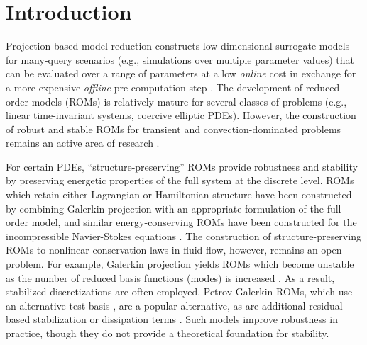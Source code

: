 \documentclass[review]{siamart171218}
\theoremstyle{assumption}
\begin{document}
\section{Introduction}

Projection-based model reduction constructs low-dimensional surrogate models for many-query scenarios (e.g., simulations over multiple parameter values) that can be evaluated over a range of parameters at a low \textit{online} cost in exchange for a more expensive \textit{offline} pre-computation step \cite{benner2015survey}.  %
The development of reduced order models (ROMs) is relatively mature for several classes of problems (e.g., linear time-invariant systems, coercive elliptic PDEs).  However, the construction of robust and stable ROMs for transient and convection-dominated problems remains an active area of research \cite{cagniart2019model}.  

For certain PDEs, ``structure-preserving'' ROMs provide robustness and stability by preserving energetic properties of the full system at the discrete level.  ROMs which retain either Lagrangian \cite{lall2003structure, carlberg2015preserving} or Hamiltonian structure \cite{polyuga2010structure, benner2012interpolation, gugercin2012structure, peng2016symplectic, chaturantabut2016structure, gong2017structure, afkham2017structure, afkham2018structure} have been constructed by combining Galerkin projection with an appropriate formulation of the full order model, and similar energy-conserving ROMs have been constructed for the incompressible Navier-Stokes equations \cite{farhat2014dimensional, farhat2015structure}.  The construction of structure-preserving ROMs to nonlinear conservation laws in fluid flow, however, remains an open problem.  For example, Galerkin projection yields ROMs which become unstable as the number of reduced basis functions (modes) is increased \cite{bui2007goal, carlberg2013gnat}.  As a result, stabilized discretizations are often employed.  Petrov-Galerkin ROMs, which use an alternative test basis \cite{maday2002blackbox, rozza2007stability, bui2007goal, amsallem2012stabilization, rozza2013reduced, ballarin2015supremizer, carlberg2017galerkin}, are a popular alternative, as are additional residual-based stabilization or dissipation terms \cite{wang2012proper, kalashnikova2014stabilization, caiazzo2014numerical, balajewicz2016minimal}.  Such models improve robustness in practice, though they do not provide a theoretical foundation for stability.  
\end{document}
